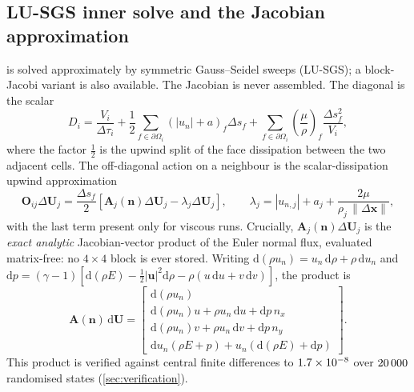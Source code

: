 \subsection{LU-SGS inner solve and the Jacobian approximation}
\label{sec:lusgs}

 is solved approximately by symmetric Gauss--Seidel sweeps
(LU-SGS); a block-Jacobi variant is also available. The Jacobian is never
assembled. The diagonal is the scalar
\begin{equation}
  D_i=\frac{V_i}{\Delta\tau_i}
  +\frac12\sum_{f\in\partial\Omega_i}\left(|u_n|+a\right)_f\Delta s_f
  +\sum_{f\in\partial\Omega_i}\left(\frac{\mu}{\rho}\right)_f\frac{\Delta s_f^2}{V_i},
  \label{eq:diag}
\end{equation}
where the factor $\tfrac12$ is the upwind split of the face dissipation between
the two adjacent cells. The off-diagonal action on a neighbour is the
scalar-dissipation upwind approximation
\begin{equation}
  \mathbf{O}_{ij}\Delta\mathbf{U}_j=\frac{\Delta s_f}{2}
  \left[\mathbf{A}_j(\mathbf{n})\Delta\mathbf{U}_j
  -\lambda_j\Delta\mathbf{U}_j\right],
  \qquad
  \lambda_j=|u_{n,j}|+a_j+\frac{2\mu}{\rho_j\,\|\Delta\mathbf{x}\|},
  \label{eq:offdiag}
\end{equation}
with the last term present only for viscous runs. Crucially,
$\mathbf{A}_j(\mathbf{n})\Delta\mathbf{U}_j$ is the \emph{exact analytic}
Jacobian-vector product of the Euler normal flux, evaluated matrix-free: no
$4\times4$ block is ever stored. Writing $\mathrm{d}(\rho u_n)=u_n\,\mathrm{d}\rho+\rho\,\mathrm{d}u_n$
and $\mathrm{d}p=(\gamma-1)\left[\mathrm{d}(\rho E)-\tfrac12|\mathbf{u}|^2\mathrm{d}\rho-\rho(u\,\mathrm{d}u+v\,\mathrm{d}v)\right]$,
the product is
\begin{equation}
  \mathbf{A}(\mathbf{n})\,\mathrm{d}\mathbf{U}=
  \begin{bmatrix}
    \mathrm{d}(\rho u_n)\\
    \mathrm{d}(\rho u_n)u+\rho u_n\,\mathrm{d}u+\mathrm{d}p\,n_x\\
    \mathrm{d}(\rho u_n)v+\rho u_n\,\mathrm{d}v+\mathrm{d}p\,n_y\\
    \mathrm{d}u_n(\rho E+p)+u_n\left(\mathrm{d}(\rho E)+\mathrm{d}p\right)
  \end{bmatrix}.
  \label{eq:jacvec}
\end{equation}
This product is verified against central finite differences to $1.7\times10^{-8}$
over $20\,000$ randomised states (\cref{sec:verification}).

